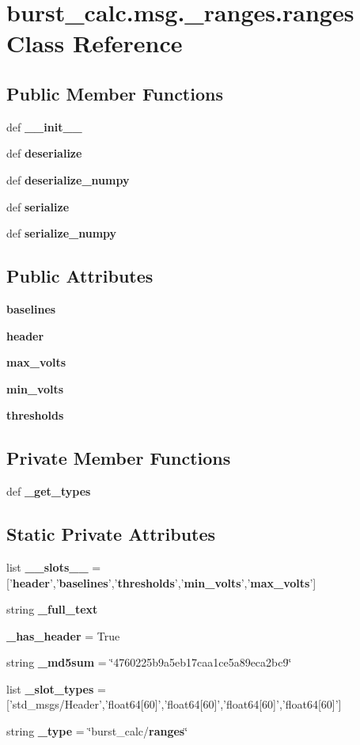 \section{burst\-\_\-calc.\-msg.\-\_\-ranges.\-ranges \-Class \-Reference}
\label{classburst__calc_1_1msg_1_1__ranges_1_1ranges}
\subsection*{\-Public \-Member \-Functions}
\begin{DoxyCompactItemize}
\item 
def {\bf \-\_\-\-\_\-init\-\_\-\-\_\-}
\item 
def {\bf deserialize}
\item 
def {\bf deserialize\-\_\-numpy}
\item 
def {\bf serialize}
\item 
def {\bf serialize\-\_\-numpy}
\end{DoxyCompactItemize}
\subsection*{\-Public \-Attributes}
\begin{DoxyCompactItemize}
\item 
{\bf baselines}
\item 
{\bf header}
\item 
{\bf max\-\_\-volts}
\item 
{\bf min\-\_\-volts}
\item 
{\bf thresholds}
\end{DoxyCompactItemize}
\subsection*{\-Private \-Member \-Functions}
\begin{DoxyCompactItemize}
\item 
def {\bf \-\_\-get\-\_\-types}
\end{DoxyCompactItemize}
\subsection*{\-Static \-Private \-Attributes}
\begin{DoxyCompactItemize}
\item 
list {\bf \-\_\-\-\_\-slots\-\_\-\-\_\-} = ['{\bf header}','{\bf baselines}','{\bf thresholds}','{\bf min\-\_\-volts}','{\bf max\-\_\-volts}']
\item 
string {\bf \-\_\-full\-\_\-text}
\item 
{\bf \-\_\-has\-\_\-header} = \-True
\item 
string {\bf \-\_\-md5sum} = \char`\"{}4760225b9a5eb17caa1ce5a89eca2bc9\char`\"{}
\item 
list {\bf \-\_\-slot\-\_\-types} = ['std\-\_\-msgs/\-Header','float64[60]','float64[60]','float64[60]','float64[60]']
\item 
string {\bf \-\_\-type} = \char`\"{}burst\-\_\-calc/{\bf ranges}\char`\"{}
\end{DoxyCompactItemize}


